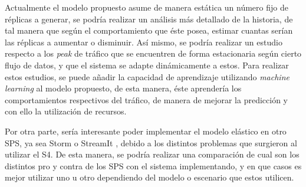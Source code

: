 Actualmente el modelo propuesto asume de manera estática un número fijo de réplicas a generar, se podría realizar un análisis más detallado de la historia, de tal manera que según el comportamiento que éste posea, estimar cuantas serían las réplicas a aumentar o disminuir. Así mismo, se podría realizar un estudio respecto a los \textit{peak} de tráfico que se encuentren de forma estacionaria según cierto flujo de datos, y que el sistema se adapte dinámicamente a estos. Para realizar estos estudios, se puede añadir la capacidad de aprendizaje utilizando \textit{machine learning} \citep{bookMohri2012} al modelo propuesto, de esta manera, éste aprendería los comportamientos respectivos del tráfico, de manera de mejorar la predicción y con ello la utilización de recursos.


Por otra parte, sería interesante poder implementar el modelo elástico en otro SPS, ya sea Storm \citep{stormtwitter} o StreamIt \citep{ThiesKA02}, debido a los distintos problemas que surgieron al utilizar el S4. De esta manera, se podría realizar una comparación de cual son los distintos pro y contra de los SPS con el sistema implementando, y en que casos es mejor utilizar uno u otro dependiendo del modelo o escenario que estos utilicen.